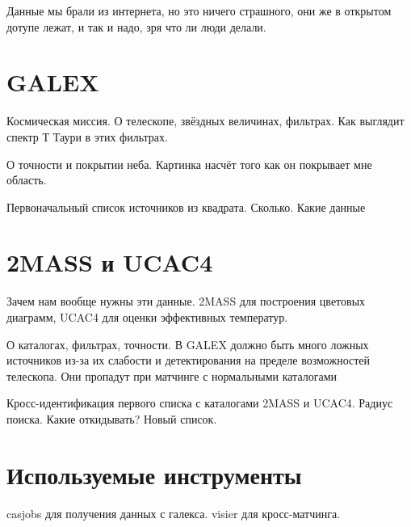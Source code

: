 Данные мы брали из интернета, но это ничего страшного, они же в открытом дотупе лежат, и так и надо, зря что ли люди делали.

\section{GALEX}
Космическая миссия. О телескопе, звёздных величинах, фильтрах. Как выглядит спектр Т Таури в этих фильтрах.

О точности и покрытии неба. Картинка насчёт того как он покрывает мне область.

Первоначальный список источников из квадрата. Сколько. Какие данные

\section{2MASS и UCAC4}
Зачем нам вообще нужны эти данные. 2MASS для построения цветовых диаграмм, UCAC4 для оценки эффективных температур.

О каталогах, фильтрах, точности. В GALEX должно быть много ложных источников из-за их слабости и детектирования на пределе возможностей телескопа. Они пропадут при матчинге с нормальными каталогами
 
Кросс-идентификация первого списка с каталогами 2MASS и UCAC4. Радиус поиска. Какие откидывать? Новый список.

\section{Используемые инструменты}
casjobs для получения данных с галекса. visier для кросс-матчинга.
